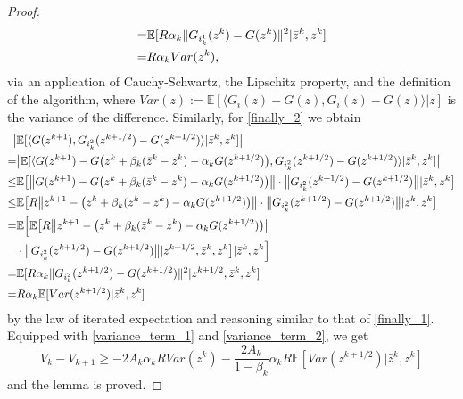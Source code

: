 \documentclass[11pt,reqno,oneside]{amsart}
\theoremstyle{definition}
\numberwithin{equation}{section}
\begin{document}
\begin{proof}
\begin{align}
        =&\mathbb{E}[R\alpha_{k}\|G_{i_{k}^{1}}(z^{k}) - G(z^{k})\|^{2}|\bar{z}^{k},z^{k}] \notag \\
        =&R\alpha_{k} Var(z^{k}), \label{variance_term_1}
    \end{align}
    via an application of Cauchy-Schwartz, the Lipschitz property, and the definition of the algorithm, where $Var(z) := \mathbb{E}[\langle G_{i}(z) - G(z), G_{i}(z) - G(z)\rangle | z]$ is the variance of the difference.
    Similarly, for \eqref{finally_2} we obtain
    \begin{align}
        \big{|}&\mathbb{E}[ \langle G(z^{k+1}), G_{i_{k}^{2}}(z^{k+1/2}) - G(z^{k+1/2})\rangle |\bar{z}^{k},z^{k}]\big{|} \notag \\
        =&\big{|}\mathbb{E}[ \langle G(z^{k+1}) - G\big{(}z^{k} + \beta_{k}(\bar{z}^{k} - z^{k}) - \alpha_{k}G(z^{k+1/2})\big{)}, G_{i_{k}^{2}}(z^{k+1/2}) - G(z^{k+1/2})\rangle |\bar{z}^{k},z^{k}]\big{|} \notag \\
        \leq&\mathbb{E}\big{[} \big{\|}G(z^{k+1}) - G\big{(}z^{k} + \beta_{k}(\bar{z}^{k} - z^{k}) - \alpha_{k}G(z^{k+1/2})\big{)}\big{\|} \cdot \big{\|}G_{i_{k}^{2}}(z^{k+1/2}) - G(z^{k+1/2})\big{\|}  |\bar{z}^{k},z^{k}\big{]} \notag \\
        \leq&\mathbb{E}\big{[} R\big{\|}z^{k+1} - \big{(}z^{k} + \beta_{k}(\bar{z}^{k} - z^{k}) - \alpha_{k}G(z^{k+1/2})\big{)}\big{\|} \cdot \big{\|}G_{i_{k}^{2}}(z^{k+1/2}) - G(z^{k+1/2})\big{\|}  |\bar{z}^{k},z^{k}\big{]} \notag \\
        =&\mathbb{E}\Big{[} \mathbb{E} \big{[} R\big{\|}z^{k+1} - \big{(}z^{k} + \beta_{k}(\bar{z}^{k} - z^{k}) - \alpha_{k}G(z^{k+1/2})\big{)}\big{\|} \notag \\
        & \cdot \big{\|}G_{i_{k}^{2}}(z^{k+1/2}) - G(z^{k+1/2}) \big{\|} | z^{k+1/2},\bar{z}^{k}, z^{k} \big{]} |\bar{z}^{k},z^{k}\Big{]} \notag \\
        =&\mathbb{E}[R\alpha_{k}\|G_{i_{k}^{2}}(z^{k+1/2}) - G(z^{k+1/2})\|^{2}|z^{k+1/2},\bar{z}^{k},z^{k}] \notag \\
        =&R\alpha_{k}\mathbb{E}[Var(z^{k+1/2})|\bar{z}^{k},z^{k}] \label{variance_term_2}
    \end{align}
    by the law of iterated expectation and reasoning similar to that of \eqref{finally_1}.
    Equipped with \eqref{variance_term_1} and \eqref{variance_term_2}, we get
    \begin{equation}
        V_{k} - V_{k+1} \geq -2A_{k}\alpha_{k}RVar(z^{k}) - \frac{2A_{k}}{1 - \beta_{k}}\alpha_{k}R\mathbb{E}[Var(z^{k+1/2})|\bar{z}^{k},z^{k}] \label{difference_bound}
    \end{equation}
    and the lemma is proved.
\end{proof}
\end{document}

